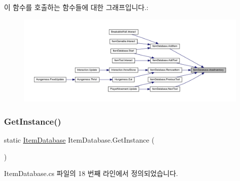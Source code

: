 이 함수를 호출하는 함수들에 대한 그래프입니다.\+:\nopagebreak
\begin{figure}[H]
\begin{center}
\leavevmode
\includegraphics[width=350pt]{d0/dc6/class_item_database_a587c4dbaea6399d804f3bb0d0ca377df_icgraph}
\end{center}
\end{figure}
\mbox{\label{class_item_database_a5312023347462b5af9c545c42934d26b}} 
\subsubsection{\texorpdfstring{GetInstance()}{GetInstance()}}
{\footnotesize\ttfamily static \mbox{\hyperlink{class_item_database}{Item\+Database}} Item\+Database.\+Get\+Instance (\begin{DoxyParamCaption}{ }\end{DoxyParamCaption})\hspace{0.3cm}{\ttfamily [static]}}



Item\+Database.\+cs 파일의 18 번째 라인에서 정의되었습니다.


